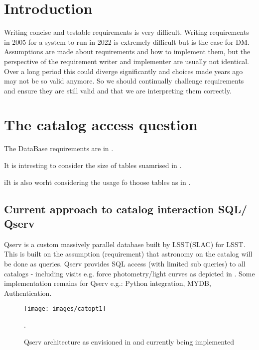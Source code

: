 \section{Introduction} \label{sec:intro}
 Writing concise and testable requirements is very difficult.
 Writing requirements in 2005 for a system to run in 2022 is extremely difficult but is the case for DM.
Assumptions are made about requirements and how to implement them, but
the perspective of the requirement writer and implementer are usually not identical.
Over a long period this could diverge significantly and  choices made years ago may not be so valid anymore.
So we should continually challenge requirements and ensure they are still valid and that we are interpreting them correctly.


\section{The catalog  access  question}\label{sec:cat}
The DataBase requirements are in .

It is intresting to consider the size of tables suamrised in .


iIt is also worht considering the usage fo thoose tables as in .

\subsection{Current approach to catalog interaction SQL/ Qserv}
\label{sec:qserv}
Qserv is a custom massively parallel database built  by LSST(SLAC) for LSST.
This is built on the assumption (requirement) that astronomy on the catalog will be done as queries.
Qserv provides SQL access (with limited sub queries) to all catalogs - including visits e.g. force photometry/light curves as depicted in .
Some implementation remains for Qserv e.g.: Python integration, MYDB, Authentication.

\begin{figure}
\begin{center}
 \texttt{[image: images/catopt1]}
\caption{Qserv architecture as envisioned in   and currently being implemented \label{fig:catopt1}}.
\end{center}
\end{figure}

